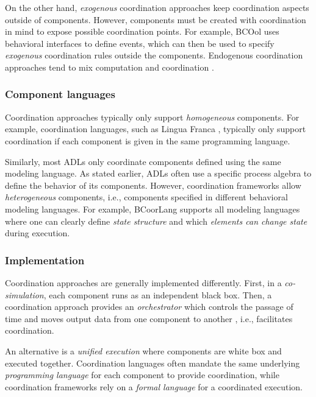\documentclass[runningheads]{llncs}
\begin{document}
On the other hand, \textit{exogenous} coordination approaches keep coordination aspects outside of components.
However, components must be created with coordination in mind to expose possible coordination points.
For example, BCOol \cite{varalarsenBehavioralCoordinationOperator2015} uses behavioral interfaces to define events, which can then be used to specify \textit{exogenous} coordination rules outside the components.
Endogenous coordination approaches tend to mix computation and coordination \cite{arbabWhatYouMean1998}.

\subsubsection{Component languages} Coordination approaches typically only support \textit{homogeneous} components.
For example, coordination languages, such as Lingua Franca \cite{lohstrohReactorsDeterministicModel2020}, typically only support coordination if each component is given in the same programming language.

Similarly, most ADLs only coordinate components defined using the same modeling language.
As stated earlier, ADLs often use a specific process algebra to define the behavior of its components.
However, coordination frameworks allow \textit{heterogeneous} components, i.e., components specified in different behavioral modeling languages.
For example, BCoorLang \cite{krauterBehavioralConsistencyMultimodeling2023} supports all modeling languages where one can clearly define \textit{state structure} and which \textit{elements can change state} during execution.

\subsubsection{Implementation} Coordination approaches are generally implemented differently.
First, in a \textit{co-simulation}, each component runs as an independent black box.
Then, a coordination approach provides an \textit{orchestrator} which controls the passage of time and moves output data from one component to another \cite{gomesCoSimulationSurvey2019}, i.e., facilitates coordination.

An alternative is a \textit{unified execution} where components are white box and executed together.
Coordination languages often mandate the same underlying \textit{programming language} for each component to provide coordination, while coordination frameworks rely on a \textit{formal language} for a coordinated execution.
\end{document}
